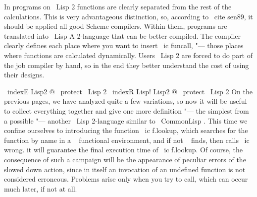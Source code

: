 In programs on \ Lisp 2 functions are clearly separated from the rest of the calculations. This is very
advantageous distinction, so, according to \ cite {sen89}, it should be applied
all good Scheme compilers. Within them, programs are translated into
\ Lisp A 2-language that can be better compiled. The compiler clearly defines
each place where you want to insert \ ic {funcall}, "--- those places where functions
are calculated dynamically. Users \ Lisp 2 are forced to do part of the job
compiler by hand, so in the end they better understand the cost of using
their designs.

\ indexE {Lisp2 @ \ protect \ Lisp 2}
\ indexR {Lisp! Lisp2 @ \ protect \ Lisp 2}
On the previous pages, we have analyzed quite a few variations, so now
it will be useful to collect everything together and give one more definition "--- the simplest
from a possible "--- another \ Lisp 2-language similar to { \ CommonLisp }. This time
we confine ourselves to introducing the function \ ic {f.lookup}, which searches for the function by
name in a ~ functional environment, and if not ~ finds, then calls \ ic {wrong}. it
will guarantee the final execution time of \ ic {f.lookup}. Of course,
the consequence of such a campaign will be the appearance of peculiar errors of the slowed down
action, since in itself an invocation of an undefined function is not considered
erroneous. Problems arise only when you try to call, which can occur
much later, if not at all.

